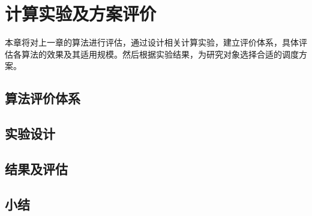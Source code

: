 \chapter{计算实验及方案评价}
本章将对上一章的算法进行评估，通过设计相关计算实验，建立评价体系，具体评估各算法的效果及其适用规模。然后根据实验结果，为研究对象选择合适的调度方案。
\section{算法评价体系}

\section{实验设计}

\section{结果及评估}


\section{小结}